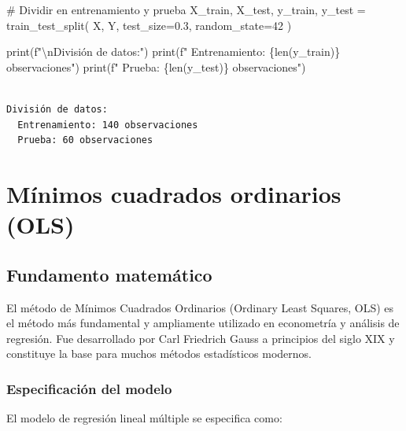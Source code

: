\documentclass[
  doc,
  floatsintext,
  longtable,
  a4paper,
  nolmodern,
  notxfonts,
  notimes,
  12pt,
  colorlinks=true,linkcolor=blue,citecolor=blue,urlcolor=blue]{apa7}
\newenvironment{Shaded}{\begin{snugshade}}{\end{snugshade}}
\newcommand{\BuiltInTok}[1]{\textcolor[rgb]{0.00,0.23,0.31}{#1}}
\newcommand{\CharTok}[1]{\textcolor[rgb]{0.13,0.47,0.30}{#1}}
\newcommand{\CommentTok}[1]{\textcolor[rgb]{0.37,0.37,0.37}{#1}}
\newcommand{\DecValTok}[1]{\textcolor[rgb]{0.68,0.00,0.00}{#1}}
\newcommand{\FloatTok}[1]{\textcolor[rgb]{0.68,0.00,0.00}{#1}}
\newcommand{\NormalTok}[1]{\textcolor[rgb]{0.00,0.23,0.31}{#1}}
\newcommand{\OperatorTok}[1]{\textcolor[rgb]{0.37,0.37,0.37}{#1}}
\newcommand{\SpecialCharTok}[1]{\textcolor[rgb]{0.37,0.37,0.37}{#1}}
\newcommand{\SpecialStringTok}[1]{\textcolor[rgb]{0.13,0.47,0.30}{#1}}
\begin{document}
\begin{Shaded}
\begin{Highlighting}[]
\CommentTok{\# Dividir en entrenamiento y prueba}
\NormalTok{X\_train, X\_test, y\_train, y\_test }\OperatorTok{=}\NormalTok{ train\_test\_split(}
\NormalTok{    X, Y, test\_size}\OperatorTok{=}\FloatTok{0.3}\NormalTok{, random\_state}\OperatorTok{=}\DecValTok{42}
\NormalTok{)}

\BuiltInTok{print}\NormalTok{(}\SpecialStringTok{f"}\CharTok{\textbackslash{}n}\SpecialStringTok{División de datos:"}\NormalTok{)}
\BuiltInTok{print}\NormalTok{(}\SpecialStringTok{f"  Entrenamiento: }\SpecialCharTok{\{}\BuiltInTok{len}\NormalTok{(y\_train)}\SpecialCharTok{\}}\SpecialStringTok{ observaciones"}\NormalTok{)}
\BuiltInTok{print}\NormalTok{(}\SpecialStringTok{f"  Prueba: }\SpecialCharTok{\{}\BuiltInTok{len}\NormalTok{(y\_test)}\SpecialCharTok{\}}\SpecialStringTok{ observaciones"}\NormalTok{)}
\end{Highlighting}
\end{Shaded}

\begin{verbatim}

División de datos:
  Entrenamiento: 140 observaciones
  Prueba: 60 observaciones
\end{verbatim}

\section{Mínimos cuadrados ordinarios
(OLS)}\label{muxednimos-cuadrados-ordinarios-ols}

\subsection{Fundamento matemático}\label{fundamento-matemuxe1tico}

El método de Mínimos Cuadrados Ordinarios (Ordinary Least Squares, OLS)
es el método más fundamental y ampliamente utilizado en econometría y
análisis de regresión. Fue desarrollado por Carl Friedrich Gauss a
principios del siglo XIX y constituye la base para muchos métodos
estadísticos modernos.

\subsubsection{Especificación del
modelo}\label{especificaciuxf3n-del-modelo}

El modelo de regresión lineal múltiple se especifica como:
\end{document}
